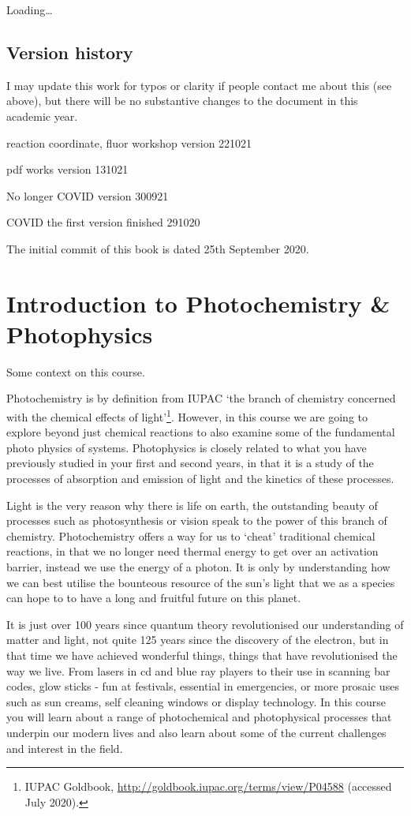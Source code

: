 \documentclass[
]{book}
\begin{document}
Loading\ldots{}

\hypertarget{version-history}{%
\section*{Version history}\label{version-history}}

I may update this work for typos or clarity if people contact me about this (see above), but there will be no substantive changes to the document in this academic year.

reaction coordinate, fluor workshop version 221021

pdf works version 131021

No longer COVID version 300921

COVID the first version finished 291020

The initial commit of this book is dated 25th September 2020.

\hypertarget{ch:Intro}{%
\chapter{Introduction to Photochemistry \& Photophysics}\label{ch:Intro}}

Some context on this course.

Photochemistry is by definition from IUPAC `the branch of chemistry concerned with the chemical effects of light'\footnote{IUPAC Goldbook, \url{http://goldbook.iupac.org/terms/view/P04588} (accessed July 2020).}. However, in this course we are going to explore beyond just chemical reactions to also examine some of the fundamental photo physics of systems. Photophysics is closely related to what you have previously studied in your first and second years, in that it is a study of the processes of absorption and emission of light and the kinetics of these processes.

Light is the very reason why there is life on earth, the outstanding beauty of processes such as photosynthesis or vision speak to the power of this branch of chemistry. Photochemistry offers a way for us to `cheat' traditional chemical reactions, in that we no longer need thermal energy to get over an activation barrier, instead we use the energy of a photon. It is only by understanding how we can best utilise the bounteous resource of the sun's light that we as a species can hope to to have a long and fruitful future on this planet.

It is just over 100 years since quantum theory revolutionised our understanding of matter and light, not quite 125 years since the discovery of the electron, but in that time we have achieved wonderful things, things that have revolutionised the way we live. From lasers in cd and blue ray players to their use in scanning bar codes, glow sticks - fun at festivals, essential in emergencies, or more prosaic uses such as sun creams, self cleaning windows or display technology. In this course you will learn about a range of photochemical and photophysical processes that underpin our modern lives and also learn about some of the current challenges and interest in the field.
\end{document}
